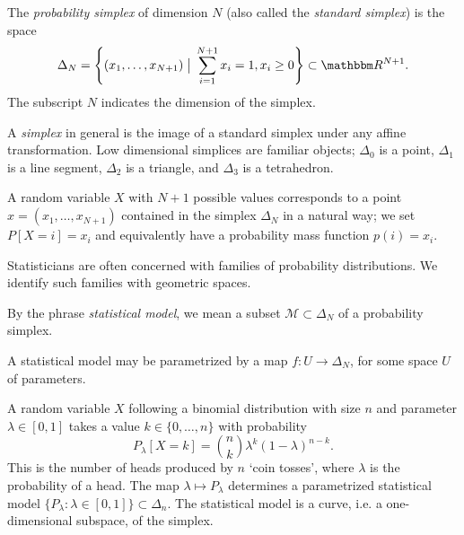 \documentclass[11pt,titlepage]{article}
\newcommand*{\Mod}{\mathcal{M}}
\newcommand*{\vbar}{\;\big\vert\;}
\numberwithin{equation}{section}
\begin{document}
    \begin{definition} The \emph{probability simplex} of dimension $N$ (also
    called the \emph{standard simplex}) is the space
    \[
        \Delta_N = 
        \left\{(x_1, \ldots, x_{N+1}) \vbar \sum_{i=1}^{N+1} x_i= 1, x_i \ge 0 \right\} 
        \subset
        \R^{N+1}.
    \]
    The subscript $N$ indicates the dimension of the simplex.
    \end{definition}
    A \emph{simplex} in general is the image of a standard simplex under any
    affine transformation.  Low dimensional simplices are familiar objects;
    $\Delta_0$ is a point, $\Delta_1$ is a line segment, $\Delta_2$ is a
    triangle, and $\Delta_3$ is a tetrahedron.
    \begin{center}
    \end{center}
    A random variable $X$ with $N+1$ possible values corresponds to a point $x =
    (x_1, \ldots, x_{N+1})$ contained in the simplex $\Delta_N$ in a natural
    way; we set $P[X = i] = x_i$ and equivalently have a probability mass
    function $p(i) = x_i$.
    
    Statisticians are often concerned with families of probability
    distributions.  We identify such families with geometric spaces.
    \begin{definition}
    By the phrase \emph{statistical model}, we mean a subset $\Mod \subset
    \Delta_N$ of a probability simplex.
    \end{definition}
    \noindent A statistical model may be parametrized by a map $f: U \to
    \Delta_N$, for some space $U$ of parameters.
    \begin{example}
        A random variable $X$ following a binomial distribution with size $n$
        and parameter $\lambda \in [0,1]$ takes a value $k \in \{0,\ldots, n\}$
        with probability
        \[
            P_\lambda[X = k] = {n \choose k} \lambda^k(1-\lambda)^{n-k}.
        \]
        This is the number of heads produced by $n$ `coin tosses', where
        $\lambda$ is the probability of a head.  The map $\lambda \mapsto
        P_\lambda$ determines a parametrized statistical model $\{P_\lambda :
        \lambda \in [0,1] \} \subset \Delta_n$. The statistical model is a
        curve, i.e. a one-dimensional subspace, of the simplex.
    \end{example}
    
\end{document}
